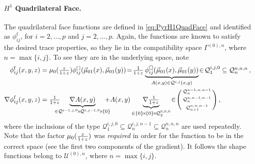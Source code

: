 \paragraph{\texorpdfstring{$H^1$}{H1} Quadrilateral Face.}
The quadrilateral face functions are defined in \eqref{eq:PyrH1QuadFace} and identified as $\phi_{ij}^\mathrm{f}$, for $i=2,\ldots,p$ and $j=2,\ldots,p$.
Again, the functions are known to satisfy the desired trace properties, so they lie in the compatibility space $\Gamma^{(0),n}$, where $n=\max\{i,j\}$.
To see they are in the underlying space, note
\begin{equation}
\begin{aligned}
	\phi_{ij}^\mathrm{f}(x,y,z)&=\mu_0(\szzz)\phi_{ij}^\square(\vec{\mu}_{01}(x),\vec{\mu}_{01}(y))
		\!=\!\textstyle{\frac{1}{1+z}}
			\underbrace{\phi_{ij}^\square(\vec{\mu}_{01}(x),\vec{\mu}_{01}(y))}_{A(x,y)\in\mathcal{Q}^{i,j}(x,y)}
				\!\in\!\mathcal{Q}_1^{i,j,0}\subseteq\mathcal{Q}_n^{n,n,n}\,,\\
	\nabla\phi_{ij}^\mathrm{f}(x,y,z)&=\textstyle{\frac{1}{1+z}}\!\!\!\!\!\!
		\underbrace{\nabla A(x,y)}_{\in\mathcal{Q}^{i-1,j,0}\!\times\!\mathcal{Q}^{i,j-1,0}\!\times\!\{0\}}\!\!\!\!\!\!
				+A(x,y)\underbrace{\nabla\textstyle{\frac{1}{1+z}}}_{\in\{0\}\!\times\!\{0\}\!\times\!\mathcal{Q}_{2}^{0,0,0}}
			\!\in\!\Bigg(\begin{smallmatrix}\mathcal{Q}_n^{n-1,n,n-1}\\[2pt]\mathcal{Q}_n^{n,n-1,n-1}\\[2pt]
				\mathcal{Q}_{n+1}^{n,n,n-1}\end{smallmatrix}\Bigg)\,,
\end{aligned}
\end{equation}
where the inclusions of the type $\mathcal{Q}_1^{i,j,0}\subseteq\mathcal{Q}_n^{i,j,n-1}\subseteq\mathcal{Q}_n^{n,n,n}$ are used repeatedly.
Note that the factor $\mu_0(\textstyle{\frac{z}{1+z}})$ was \textit{required} in order for the function to be in the correct space (see the first two components of the gradient).
It follows the shape functions belong to $\mathcal{U}^{(0),n}$, where $n=\max\{i,j\}$.

